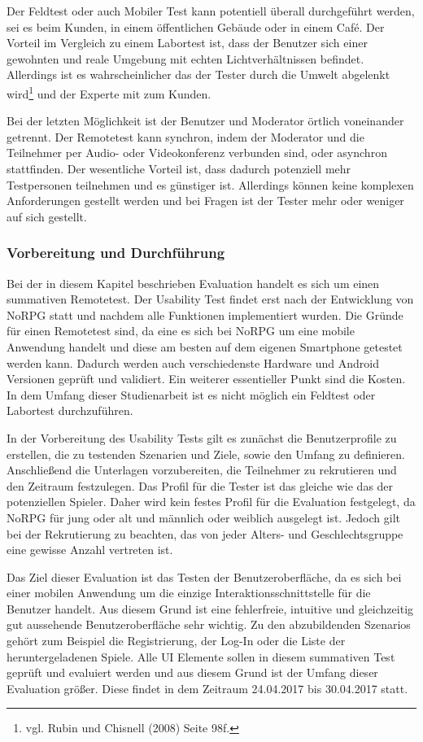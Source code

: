 			Der Feldtest oder auch Mobiler Test kann potentiell überall durchgeführt werden, sei es beim Kunden, in einem öffentlichen Gebäude oder in einem Café. Der Vorteil im Vergleich zu einem Labortest ist, dass der Benutzer sich einer gewohnten und reale Umgebung mit echten Lichtverhältnissen befindet. Allerdings ist es wahrscheinlicher das der Tester durch die Umwelt abgelenkt wird\footnote{vgl. Rubin und Chisnell \cite{handbookUsability} (2008) Seite 98f.} und der Experte mit zum Kunden. 
			
			Bei der letzten Möglichkeit ist der Benutzer und Moderator örtlich voneinander getrennt. Der Remotetest kann synchron, indem der Moderator und die Teilnehmer per Audio- oder Videokonferenz verbunden sind, oder asynchron stattfinden. Der wesentliche Vorteil ist, dass dadurch potenziell mehr Testpersonen teilnehmen und es günstiger ist. Allerdings können keine komplexen Anforderungen gestellt werden und bei Fragen ist der Tester mehr oder weniger auf sich gestellt.

			\subsubsection{Vorbereitung und Durchführung}
				Bei der in diesem Kapitel beschrieben Evaluation handelt es sich um einen summativen Remotetest. Der Usability Test findet erst nach der Entwicklung von NoRPG statt und nachdem alle Funktionen implementiert wurden. Die Gründe für einen Remotetest sind, da eine es sich bei NoRPG um eine mobile Anwendung handelt und diese am besten auf dem eigenen Smartphone getestet werden kann. Dadurch werden auch verschiedenste Hardware und Android Versionen geprüft und validiert. Ein weiterer essentieller Punkt sind die Kosten. In dem Umfang dieser Studienarbeit ist es nicht möglich ein Feldtest oder Labortest durchzuführen.

				In der Vorbereitung des Usability Tests gilt es zunächst die Benutzerprofile zu erstellen, die zu testenden Szenarien und Ziele, sowie den Umfang zu definieren. Anschließend die Unterlagen vorzubereiten, die Teilnehmer zu rekrutieren und den Zeitraum festzulegen. Das Profil für die Tester ist das gleiche wie das der potenziellen Spieler. Daher wird kein festes Profil für die Evaluation festgelegt, da NoRPG für jung oder alt und männlich oder weiblich ausgelegt ist. Jedoch gilt bei der Rekrutierung zu beachten, das von jeder Alters- und Geschlechtsgruppe eine gewisse Anzahl vertreten ist.

				Das Ziel dieser Evaluation ist das Testen der Benutzeroberfläche, da es sich bei einer mobilen Anwendung um die einzige Interaktionsschnittstelle für die Benutzer handelt. Aus diesem Grund ist eine fehlerfreie, intuitive und gleichzeitig gut aussehende Benutzeroberfläche sehr wichtig. Zu den abzubildenden Szenarios gehört zum Beispiel die Registrierung, der Log-In oder die Liste der heruntergeladenen Spiele. Alle \ac{UI} Elemente sollen in diesem summativen Test geprüft und evaluiert werden und aus diesem Grund ist der Umfang dieser Evaluation größer. Diese findet in dem Zeitraum 24.04.2017 bis 30.04.2017 statt.


